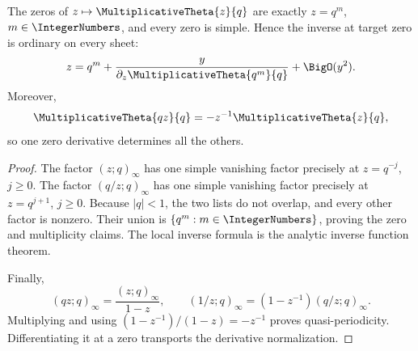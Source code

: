 \begin{proposition}
\label{prop:qs-theta-zeros}
The zeros of \(z\mapsto\MultiplicativeTheta{z}{q}\) are exactly
\(z=q^m\), \(m\in\IntegerNumbers\), and every zero is simple.  Hence the inverse at target
zero is ordinary on every sheet:
\[
  z=q^m+\frac{y}{\partial_z\MultiplicativeTheta{q^m}{q}}+\BigO(y^2).
\]
Moreover,
\[
  \MultiplicativeTheta{qz}{q}=-z^{-1}\MultiplicativeTheta{z}{q},
\]
so one zero derivative determines all the others.
\end{proposition}

\begin{proof}
The factor \((z;q)_\infty\) has one simple vanishing factor precisely at
\(z=q^{-j}\), \(j\ge0\).  The factor \((q/z;q)_\infty\) has one simple
vanishing factor precisely at \(z=q^{j+1}\), \(j\ge0\).  Because
\(|q|<1\), the two lists do not overlap, and every other factor is nonzero.
Their union is \(\{q^m:m\in\IntegerNumbers\}\), proving the zero and multiplicity claims.
The local inverse formula is the analytic inverse function theorem.

Finally,
\[
  (qz;q)_\infty=\frac{(z;q)_\infty}{1-z},
  \qquad
  (1/z;q)_\infty=(1-z^{-1})(q/z;q)_\infty.
\]
Multiplying and using
\((1-z^{-1})/(1-z)=-z^{-1}\) proves quasi-periodicity.  Differentiating it
at a zero transports the derivative normalization.
\end{proof}
